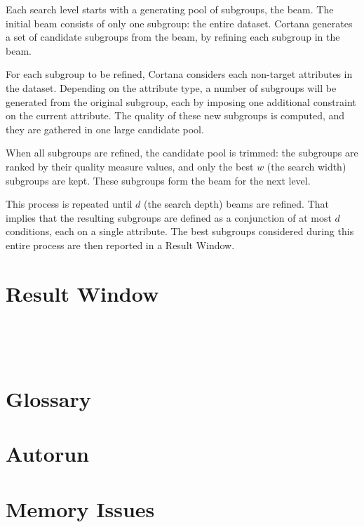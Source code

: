 \documentclass{article}
\begin{document}
Each search level starts with a generating pool of subgroups, the
\gls{beam}.  The initial beam consists of only one subgroup: the entire
dataset.  Cortana generates a set of candidate subgroups from the beam, by
refining each subgroup in the beam.

For each subgroup to be refined, Cortana considers each non-target
attributes in the dataset.  Depending on the attribute type, a number of
subgroups will be generated from the original subgroup, each by imposing one
additional constraint on the current attribute. The quality of these new
subgroups is computed, and they are gathered in one large candidate pool.

When all subgroups are refined, the candidate pool is trimmed: the subgroups
are ranked by their quality measure values, and only the best $w$ (the
\gls{search width}) subgroups are kept. These subgroups form the \gls{beam}
for the next level.

This process is repeated until $d$ (the \gls{search depth}) beams are
refined.  That implies that the resulting subgroups are defined as a
conjunction of at most $d$ conditions, each on a single attribute.  The best
subgroups considered during this entire process are then reported in a
Result Window.

\section{Result Window}
\label{section:result-window}

\appendix
\clearpage
~\vfill


\vfill~
\clearpage

\section{Glossary}
\vspace{-10mm}
\renewcommand*{\glossaryname}{}
\printglossaries

\section{Autorun}

\section{Memory Issues}
\label{sec:memory}
\end{document}
